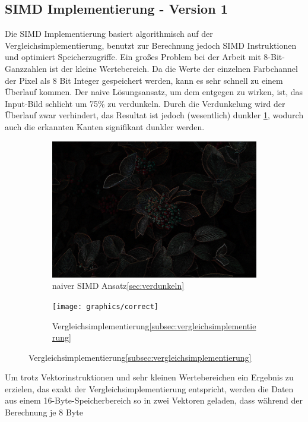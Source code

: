\documentclass[course=erap]{aspdoc}
\begin{document}
\subsection{SIMD Implementierung - Version 1}
\label{subsec:simd-implementierung}
Die SIMD Implementierung basiert algorithmisch auf der Vergleichsimplementierung, benutzt zur Berechnung jedoch SIMD Instruktionen und optimiert Speicherzugriffe.
Ein großes Problem bei der Arbeit mit 8-Bit-Ganzzahlen ist der kleine Wertebereich.
Da die Werte der einzelnen Farbchannel der Pixel als 8 Bit Integer gespeichert werden, kann es sehr schnell zu einem Überlauf kommen.
Der naive Lösungsansatz, um dem entgegen zu wirken, ist, das Input-Bild schlicht um 75\% zu verdunkeln. \label{sec:verdunkeln}
Durch die Verdunkelung wird der Überlauf zwar verhindert, das Resultat ist jedoch (wesentlich) dunkler {\ref{fig:dark}}, wodurch auch die erkannten Kanten signifikant dunkler werden.
\begin{figure}[H]
    \begin{subfigure}{.5\columnwidth}
        \centering
        \includegraphics[width=\columnwidth]{graphics/dark}
        \caption{naiver SIMD Ansatz\ref{sec:verdunkeln}}
        \label{fig:dark}
    \end{subfigure}
    \begin{subfigure}{.5\columnwidth}
        \centering
        \texttt{[image: graphics/correct]}
        \caption{Vergleichsimplementierung\ref{subsec:vergleichsimplementierung}}
        \label{fig:correct}
    \end{subfigure}
\end{figure}
Um trotz Vektorinstruktionen und sehr kleinen Wertebereichen ein Ergebnis zu erzielen,
das exakt der Vergleichsimplementierung entspricht, werden die Daten aus einem 16-Byte-Speicherbereich so in zwei Vektoren geladen, dass während der Berechnung je 8 Byte
\end{document}
